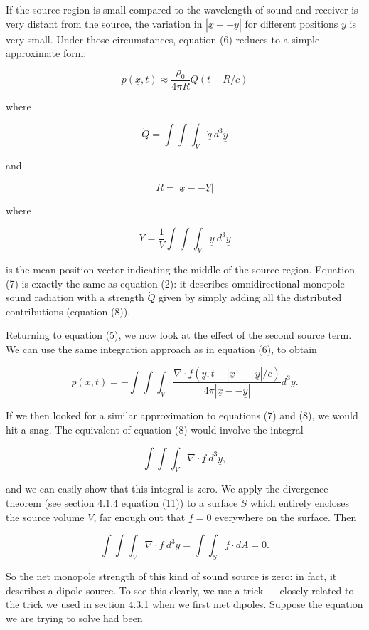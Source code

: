   If the source region is small compared to the wavelength of sound and 
  receiver is very distant from the source, the variation in $|\underline{x} -- 
  \underline{y}|$ for different positions $\underline{y}$ is very small. Under 
  those circumstances, equation (6) reduces to a simple approximate form: 

  $$p(\underline{x},t) \approx \dfrac{\rho_0}{4 \pi R} \dot{Q}(t-R/c) \tag{7}$$ 

  where 

  $$\dot{Q}=\int \int \int_V{\dot{q} \mathrm{~} d^3 \underline{y}} \tag{8}$$ 

  and 

  $$R=|\underline{x} -- \underline{Y}| \tag{9}$$ 

  where 

  $$\underline{Y}=\dfrac{1}{V} \int \int \int_V{\underline{y} \mathrm{~} 
  d^3\underline{y}} \tag{10}$$ 

  is the mean position vector indicating the middle of the source region. 
  Equation (7) is exactly the same as equation (2): it describes 
  omnidirectional monopole sound radiation with a strength $\dot{Q}$ given by 
  simply adding all the distributed contributions (equation (8)). 

  Returning to equation (5), we now look at the effect of the second source 
  term. We can use the same integration approach as in equation (6), to obtain 

  $$p(\underline{x},t)=- \int \int \int_V{\dfrac{\nabla \cdot 
  \underline{f}(\underline{y},t-|\underline{x} -- \underline{y}|/c)}{4 \pi 
  |\underline{x} -- \underline{y}|} d^3 \underline{y}} . \tag{11}$$ 

  If we then looked for a similar approximation to equations (7) and (8), we 
  would hit a snag. The equivalent of equation (8) would involve the integral 

  $$\int \int \int_V{\nabla \cdot \underline{f} \mathrm{~}d^3 \underline{y}}, 
  \tag{12}$$ 

  and we can easily show that this integral is zero. We apply the divergence 
  theorem (see section 4.1.4 equation (11)) to a surface $S$ which entirely 
  encloses the source volume $V$, far enough out that $\underline{f}=0$ 
  everywhere on the surface. Then 

  $$\int \int \int_V{\nabla \cdot \underline{f} \mathrm{~}d^3 \underline{y}} = 
  \int \int_S{\underline{f} \cdot d\underline{A}} = 0 . \tag{13}$$ 

  So the net monopole strength of this kind of sound source is zero: in fact, 
  it describes a dipole source. To see this clearly, we use a trick --- closely 
  related to the trick we used in section 4.3.1 when we first met dipoles. 
  Suppose the equation we are trying to solve had been 

